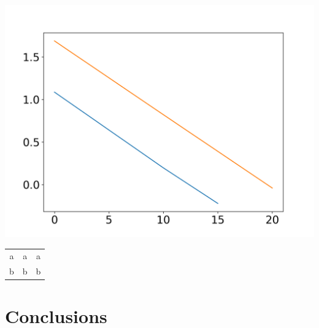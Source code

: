 \documentclass[12pt,twosides,onecolumn,openany]{article}
\newenvironment{Figura}
  {\par\medskip\noindent\minipage{\linewidth}}
  {\endminipage\par\medskip}
\begin{document}
\begin{multicols}{2}
\begin{Figura}
  \centering
  \includegraphics[width=1\linewidth]{../../graphs/practica_Ia/plots/reg_ampli.png}
  \label{fig:reg_lin_amplituds}
\end{Figura}
\begin{Figura}
  \centering
  \begin{tabular}{c|c|c}
    a & a & a \\
    b & b & b 
  \end{tabular}
  \label{tau:pendent_amplituds}
\end{Figura} 
\section{Conclusions}
\end{multicols}
\end{document}

